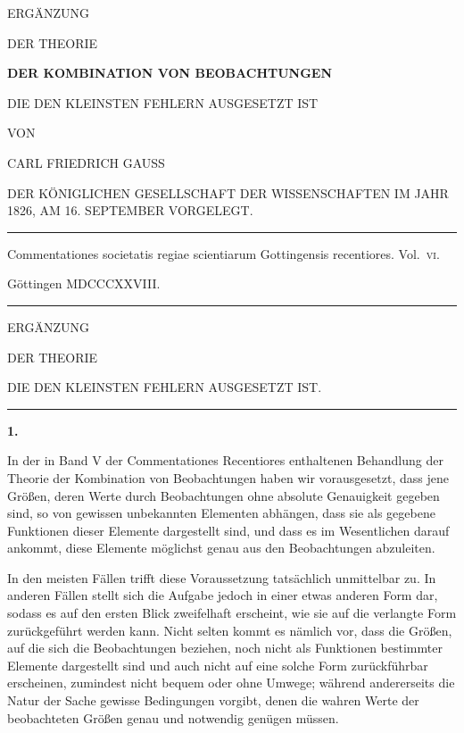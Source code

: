 \clearpage
{}
\thispagestyle{empty}
\begin{center}
\vspace*{2em}
{\Large ERGÄNZUNG\par}
\bigskip
{\Large DER THEORIE\par}
\bigskip
{\Large\bfseries DER KOMBINATION VON BEOBACHTUNGEN\par}
\bigskip
{\large DIE DEN KLEINSTEN FEHLERN AUSGESETZT IST\par}
\bigskip
VON\par
\bigskip
{\large CARL FRIEDRICH GAUSS\par}
\bigskip
{\small DER KÖNIGLICHEN GESELLSCHAFT DER WISSENSCHAFTEN IM JAHR 1826, AM 16. SEPTEMBER VORGELEGT.\par}
\bigskip
\rule{.7\linewidth}{.3pt}\par
\bigskip
Commentationes societatis regiae scientiarum Gottingensis recentiores.
\mbox{Vol.~\textsc{vi}.}
\par\medskip
Göttingen MDCCCXXVIII.
\par\bigskip
\rule{.7\linewidth}{.3pt}
\end{center}
\clearpage
\renewcommand{\Article}[1]{\par\medskip\Needspace{4\baselineskip}\pdfbookmark[1]{Art. #1}{supplementum-art-#1}\centerline{\textbf{#1.}}\nobreak\smallskip}
\begin{center}
{\large ERGÄNZUNG\par}
\medskip DER THEORIE\par
{}
\medskip DIE DEN KLEINSTEN FEHLERN AUSGESETZT IST.\par
\medskip\rule{.25\linewidth}{.3pt}
\end{center}
\Article{1}
In der in Band V der Commentationes Recentiores enthaltenen Behandlung der Theorie der Kombination von Beobachtungen haben wir vorausgesetzt, dass jene Größen, deren Werte durch Beobachtungen ohne absolute Genauigkeit gegeben sind, so von gewissen unbekannten Elementen abhängen, dass sie als gegebene Funktionen dieser Elemente dargestellt sind, und dass es im Wesentlichen darauf ankommt, diese Elemente möglichst genau aus den Beobachtungen abzuleiten.

In den meisten Fällen trifft diese Voraussetzung tatsächlich unmittelbar zu. In anderen Fällen stellt sich die Aufgabe jedoch in einer etwas anderen Form dar, sodass es auf den ersten Blick zweifelhaft erscheint, wie sie auf die verlangte Form zurückgeführt werden kann. Nicht selten kommt es nämlich vor, dass die Größen, auf die sich die Beobachtungen beziehen, noch nicht als Funktionen bestimmter Elemente dargestellt sind und auch nicht auf eine solche Form zurückführbar erscheinen, zumindest nicht bequem oder ohne Umwege; während andererseits die Natur der Sache gewisse Bedingungen vorgibt, denen die wahren Werte der beobachteten Größen genau und notwendig genügen müssen.

